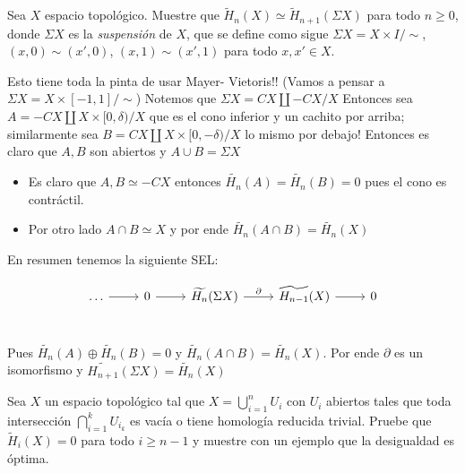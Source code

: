 \documentclass[11pt,a4paper,oneside]{article}
\newenvironment{proof}[1][Demostraci\'on]{\begin{trivlist}
\item[\hskip \labelsep {\bfseries #1}]}{\end{trivlist}}
\newcommand{\qed}{\nobreak \ifvmode \relax \else
      \ifdim\lastskip<1.5em \hskip-\lastskip
      \hskip1.5em plus0em minus0.5em \fi \nobreak
      \vrule height0.75em width0.5em depth0.25em\fi}
\begin{document}
\begin{enumerate}

\item Sea $X$ espacio topol\'ogico. Muestre que $\tilde H_n(X)\simeq \tilde H_{n+1}(\Sigma X)$ para todo $n\geq 0$, donde $\Sigma X$ es la \textit{suspensi\'on} de $X$, que se define como  sigue $\Sigma X=X\times I/\sim$, $(x,0)\sim (x',0)$, $(x,1)\sim (x',1)$ para todo $x,x'\in X$. 

\begin{proof}
Esto tiene toda la pinta de usar Mayer- Vietoris!! (Vamos a pensar a $\Sigma X = X \times [-1,1] / \sim$) Notemos que $\Sigma X = CX \coprod -CX / X$ Entonces sea $A= -CX \coprod X \times [0,\delta) / X$ que es el cono inferior y un cachito por arriba; similarmente sea $B = CX \coprod X \times [0,-\delta) / X$ lo mismo por debajo! Entonces es claro que $A,B$ son abiertos y $A \cup B = \Sigma X$

\begin{itemize}

\item 

Es claro que $A,B \simeq -CX$ entonces $\widetilde{H_n}(A)= \widetilde{H_n}(B) = 0$ pues el cono es contr\'actil.

\item

Por otro lado $A \cap B \simeq X$ y por ende $\widetilde{H_n}(A\cap B) = \widetilde{H_n}(X)$

\end{itemize}

En resumen tenemos la siguiente SEL:

\[
\begin{tikzcd}
\dots \rar & 0 \rar & \widetilde{H_n}(\Sigma X) \arrow{r}{\partial} & \widetilde{H_{n-1}}(X) \rar & 0 \\
\end{tikzcd}
\]

Pues $\widetilde{H_n}(A) \oplus \widetilde{H_n}(B) = 0$ y $\widetilde{H_n}(A \cap B) = \widetilde{H_n}(X)$. Por ende $\partial$ es un isomorfismo y $\widetilde{H_{n+1}}(\Sigma X) = \widetilde{H_n}(X)$ \qed

\end{proof}

\item Sea $X$ un espacio topol\'ogico tal que $X=\bigcup_{i=1}^n U_i$ con $U_i$ abiertos tales que toda intersecci\'on $\bigcap _{i=1}^k U_{i_k}$ es vac\'ia o tiene  homolog\'ia reducida trivial. Pruebe que $\tilde H_i(X)=0$ para todo $i\geq n-1$ y muestre con un ejemplo que la desigualdad es \'optima.


\end{enumerate}
\end{document}
